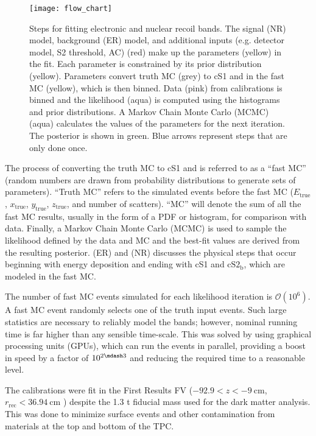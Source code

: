 \begin{figure}
\centering
\texttt{[image: flow\_chart]}
\caption[Steps for fitting electronic and nuclear recoil bands.]{Steps for fitting electronic and nuclear recoil bands.  The signal (NR)
model, background (ER) model, and additional inputs (e.g.
detector model, S2 threshold, AC) (red) make up the parameters (yellow) in the fit.  Each parameter is constrained by its
prior distribution (yellow).  Parameters convert truth MC (grey) to cS1 and \cstwob in the fast MC (yellow), which is then binned.  Data
(pink) from calibrations is binned
and the likelihood (aqua) is computed using the histograms and prior distributions.  A Markov Chain Monte Carlo (MCMC) (aqua)
calculates the values of the parameters for the next iteration.  The posterior is shown in green.  Blue arrows represent steps that are
only done once.}
\label{fig:er_nr_calibrations_parameter_determ_flow_chart}
\end{figure}

The process of converting the truth MC to cS1 and \cstwob is referred to as a ``fast MC'' (random numbers are drawn from probability
distributions to generate sets of parameters).  ``Truth MC'' refers to the simulated events before the fast MC ($E_{\mathrm{true}}$,
$x_{\mathrm{true}}$, $y_{\mathrm{true}}$, $z_{\mathrm{true}}$, and number
of scatters).  ``MC'' will denote the sum of all the fast MC results, usually in the form of a PDF or histogram, for
comparison with data.  Finally, a Markov Chain Monte Carlo (MCMC) is used to sample the likelihood defined by the data and MC and the
best-fit values
are derived from the resulting posterior.   (ER) and
 (NR) discusses the physical steps that occur beginning with energy
deposition and ending with cS1 and $\mathrm{cS2_b}$, which are modeled in the fast MC.

The number of fast MC events simulated for each likelihood iteration is $\mathcal{O}(10^6)$.  A fast MC event randomly selects one of the
truth input events.  Such large statistics are necessary to reliably model the bands;
however, nominal running time is far higher than any sensible time-scale.  This was solved by using graphical processing units (GPUs),
which can run the events in parallel, providing a boost in speed by a factor of $10^{2 \mdash 3}$ and reducing the required time to a
reasonable level.

The calibrations were fit in the First Results FV ($-92.9 < z < -9\ \mathrm{cm}$, $r_{\mathrm{rec}} < 36.94\ \mathrm{cm}$
) despite the 1.3 t fiducial mass used for the dark matter analysis.  This was done to
minimize surface events and other contamination from materials at the top and bottom of the TPC.



